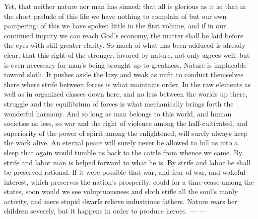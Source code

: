 \documentclass[12pt,a4paper,openany]{book}
\newcommand{\opage}[1]{\marginnote{\footnotesize\textit{[#1]}}}
\begin{document}
Yet, that neither nature nor man has sinned; that all is glorious as it is; that in
the short prelude of this life we have nothing to complain of but our own
pampering: of this we have spoken little in the first volume, and if in our
continued inquiry we can reach God's economy, the matter shall be laid before the
eyes with still greater clarity. So much of what has been adduced is already clear,
that this right of the stronger, favored by nature, not only agrees well, but is
even necessary for man's being brought up to greatness. Nature is implacable toward
sloth. It pushes aside the lazy and weak as unfit to conduct themselves there where
strife between forces is what maintains order. In the raw elements as well as in
organized classes down here, and no less between the
\setcounter{footnote}{0}%
\opage{43}worlds up there, struggle and the equilibrium of forces is what mechanically
brings forth the wonderful harmony. And so long as man belongs to this world, and
human societies no less, so war and the right of violence among the half-cultivated,
and superiority of the power of spirit among the enlightened, will surely always
keep the work alive. An eternal peace will surely never be allowed to lull us into
a sleep that again would tumble us back to the cattle from whence we came. By
strife and labor man is helped forward to what he is. By strife and labor he shall
be preserved rational. If it were possible that war, and fear of war, and wakeful
interest, which preserves the nation's prosperity, could for a time cease among the
states, soon would we see voluptuousness and sloth stifle all the soul's manly
activity, and mere stupid dwarfs relieve industrious fathers. Nature rears her
children severely, but it happens in order to produce heroes. --- ---
\end{document}
